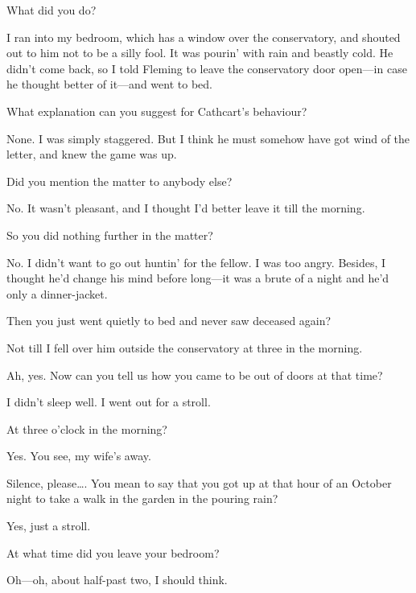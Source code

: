 \begin{dialogue}
 What did you do?

 I ran into my bedroom, which has a window over the conservatory, and shouted out to him not to be a silly fool. It was pourin' with rain and beastly cold. He didn't come back, so I told Fleming to leave the conservatory door open—in case he thought better of it—and went to bed.

 What explanation can you suggest for Cathcart's behaviour?

 None. I was simply staggered. But I think he must somehow have got wind of the letter, and knew the game was up.

 Did you mention the matter to anybody else?

 No. It wasn't pleasant, and I thought I'd better leave it till the morning.

 So you did nothing further in the matter?

 No. I didn't want to go out huntin' for the fellow. I was too angry. Besides, I thought he'd change his mind before long—it was a brute of a night and he'd only a dinner-jacket.

 Then you just went quietly to bed and never saw deceased again?

 Not till I fell over him outside the conservatory at three in the morning.

 Ah, yes. Now can you tell us how you came to be out of doors at that time?

  I didn't sleep well. I went out for a stroll.

 At three o'clock in the morning?

 Yes.  You see, my wife's away. 

 Silence, please\dots . You mean to say that you got up at that hour of an October night to take a walk in the garden in the pouring rain?

 Yes, just a stroll. 

 At what time did you leave your bedroom?

 Oh—oh, about half-past two, I should think.


\end{dialogue}
